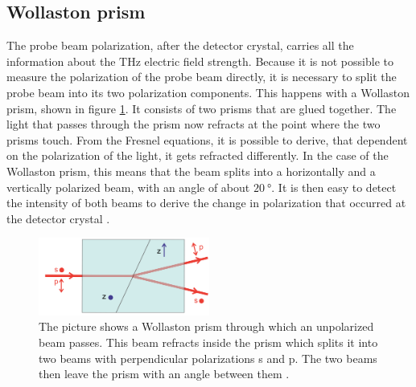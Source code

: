 \subsection{Wollaston prism}
\label{sec:wollaston}
The probe beam polarization, after the detector crystal, carries all the information about the $\si{\tera\hertz}$ electric field strength.
Because it is not possible to measure the polarization of the probe beam directly, it is necessary to split the probe beam into its two polarization components.
This happens with a Wollaston prism, shown in figure \ref{fig:wollaston}.
It consists of two prisms that are glued together.
The light that passes through the prism now refracts at the point where the two prisms touch.
From the Fresnel equations, it is possible to derive, that dependent on the polarization of the light, it gets refracted differently.
In the case of the Wollaston prism, this means that the beam splits into a horizontally and a vertically polarized beam, with an angle of about $\SI{20}{\degree}$.
It is then easy to detect the intensity of both beams to derive the change in polarization that occurred at the detector crystal \cite{wollaston_prism}. 
\begin{figure}
    \centering
    \includegraphics[width=0.5\textwidth]{Plots/wollaston_prism.png}
    \caption{The picture shows a Wollaston prism through which an unpolarized beam passes.
    This beam refracts inside the prism which splits it into two beams with perpendicular polarizations s and p.
    The two beams then leave the prism with an angle between them \cite{wollaston_prism}.}
    \label{fig:wollaston}
\end{figure}


